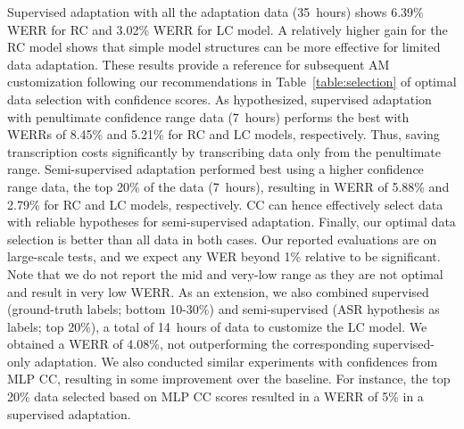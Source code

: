 \documentclass[a4paper]{article}
\begin{document}
Supervised adaptation with all the adaptation data (35~hours) shows 6.39\% WERR for RC and 3.02\% WERR for LC model. A relatively higher gain for the RC model shows that simple model structures can be more effective for limited data adaptation. These results provide a reference for subsequent AM customization following our recommendations in Table~\ref{table:selection} of optimal data selection with confidence scores. As hypothesized, supervised adaptation with penultimate confidence range data (7~hours) performs the best with WERRs of 8.45\% and 5.21\% for RC and LC models, respectively. Thus, saving transcription costs significantly by transcribing data only from the penultimate range. Semi-supervised adaptation performed best using a higher confidence range data, the top 20\% of the data (7~hours), resulting in WERR of 5.88\% and 2.79\% for RC and LC models, respectively.  CC can hence effectively select data with reliable hypotheses for semi-supervised adaptation. Finally, our optimal data selection is better than all data in both cases. Our reported evaluations are on large-scale tests, and we expect any WER beyond 1\% relative to be significant. Note that we do not report the mid and very-low range as they are not optimal and result in very low WERR. As an extension, we also combined supervised (ground-truth labels; bottom 10-30\%) and semi-supervised (ASR hypothesis as labels; top 20\%), a total of 14~hours of data to customize the LC model. We obtained a WERR of 4.08\%, not outperforming the corresponding supervised-only adaptation. We also conducted similar experiments with confidences from MLP CC, resulting in some improvement over the baseline. For instance, the top 20\% data selected based on MLP CC scores resulted in a WERR of 5\% in a supervised adaptation.  
\end{document}

